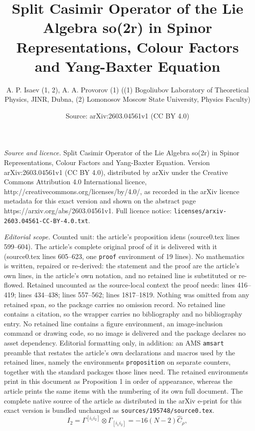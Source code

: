 \documentclass[10pt,a4paper]{amsart}
\title{Split Casimir Operator of the Lie Algebra so(2r) in Spinor Representations, Colour Factors and Yang-Baxter Equation}
\author{A. P. Isaev (1, 2), A. A. Provorov (1) ((1) Bogoliubov Laboratory of Theoretical Physics, JINR, Dubna, (2) Lomonosov Moscow State University, Physics Faculty)}
\date{Source: arXiv:2603.04561v1 (CC BY 4.0)}
\newcommand{\hC}{\widehat{C}}
\begin{document}
\maketitle

\noindent\emph{Source and licence.} Split Casimir Operator of the Lie Algebra so(2r) in Spinor Representations, Colour Factors and Yang-Baxter Equation. Version arXiv:2603.04561v1 (CC BY 4.0), distributed by arXiv under the Creative Commons Attribution 4.0 International licence, http://creativecommons.org/licenses/by/4.0/, as recorded in the arXiv licence metadata for this exact version and shown on the abstract page https://arxiv.org/abs/2603.04561v1. Full licence notice: \texttt{licenses/arxiv-2603.04561-CC-BY-4.0.txt}.\par\smallskip

\noindent\textit{Editorial scope.} Counted unit: the article's proposition idens (source0.tex lines 599--604). The article's complete original proof of it is delivered with it (source0.tex lines 605--623, one \texttt{proof} environment of 19 lines). No mathematics is written, repaired or re-derived: the statement and the proof are the article's own lines, in the article's own notation, and no retained line is substituted or re-flowed.  Retained uncounted as the source-local context the proof needs: lines 416--419; lines 434--438; lines 557--562; lines 1817--1819.  Nothing was omitted from any retained span, so the package carries no omission record.  No retained line contains a citation, so the wrapper carries no bibliography and no bibliography entry.  No retained line contains a figure environment, an image-inclusion command or drawing code, so no image is delivered and the package declares no asset dependency.  Editorial formatting only, in addition: an AMS \texttt{amsart} preamble that restates the article's own declarations and macros used by the retained lines, namely the environments \texttt{proposition} on separate counters, together with the standard packages those lines need.  The retained environments print in this document as Proposition 1 in order of appearance, whereas the article prints the same items with the numbering of its own full document.  The complete native source of the article as distributed in the arXiv e-print for this exact version is bundled unchanged as \texttt{sources/195748/source0.tex}.
\begin{equation}\label{I2 via hC}
I_2=\Gamma^{[i_1 i_2]}\otimes \Gamma_{[i_1 i_2]}
=-16(N-2)\hC_\rho,
\end{equation}
\end{document}

